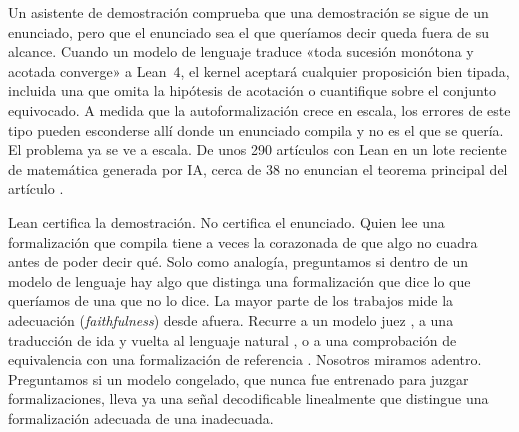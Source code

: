 \documentclass[10pt]{article}
\begin{document}
Un asistente de demostración comprueba que una demostración se sigue de un enunciado, pero que el enunciado sea el
que queríamos decir queda fuera de su alcance. Cuando un modelo de lenguaje traduce «toda sucesión monótona y acotada
converge» a Lean~4, el kernel aceptará cualquier proposición bien tipada, incluida una que omita la hipótesis de
acotación o cuantifique sobre el conjunto equivocado. A medida que la autoformalización crece en escala, los errores
de este tipo pueden esconderse allí donde un enunciado compila y no es el que se quería.
El problema ya se ve a escala. De unos 290 artículos con Lean en un lote reciente de matemática generada por IA, cerca
de 38 no enuncian el teorema principal del artículo \citep{xena2026checked}.

Lean certifica la demostración. No certifica el enunciado. Quien lee una formalización que compila tiene a veces la
corazonada de que algo no cuadra antes de poder decir qué. Solo como analogía, preguntamos si dentro de un modelo de
lenguaje hay algo que distinga una formalización que dice lo que queríamos de una que no lo dice.
La mayor parte de los trabajos mide la adecuación (\emph{faithfulness}) desde afuera. Recurre a un modelo juez
\citep{criticlean,formalalign,zhang2026beyondcompilation,wang2026formalrx}, a una traducción de ida y vuelta al
lenguaje natural \citep{amrollahi2026roundtrip}, o a una comprobación de equivalencia con una formalización de
referencia \citep{proofnetverif,mohammad2026faithfulnessgap}. Nosotros miramos adentro. Preguntamos si un modelo
congelado, que nunca fue entrenado para juzgar formalizaciones, lleva ya una señal decodificable linealmente que
distingue una formalización adecuada de una inadecuada.
\end{document}
